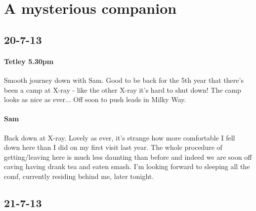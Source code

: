 \begin{marginfigure}
\end{marginfigure}

\section{A mysterious companion}

\subsection{20-7-13}

\paragraph{Tetley 5.30pm}
Smooth journey down with Sam. Good to be back for the 5th year that there’s been a camp at X-ray - like the other X-ray it’s hard to shut down! The camp looks as nice as ever... Off soon to push leads in Milky Way.

\paragraph{Sam}
Back down at X-ray. Lovely as ever, it’s strange how more comfortable I fell down here than I did on my first visit last year. The whole procedure of getting/leaving here is much less daunting than before and indeed we are soon off caving having drank tea and eaten smash. I’m looking forward to sleeping all the comf, currently residing behind me, later tonight.


\subsection{21-7-13}

